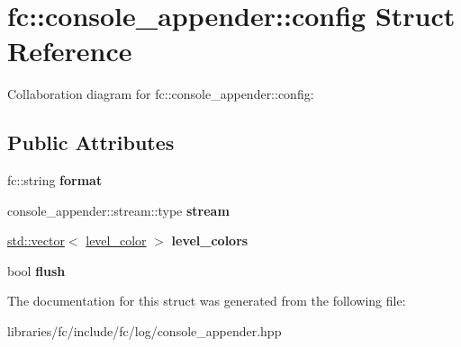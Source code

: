 \hypertarget{structfc_1_1console__appender_1_1config}{}\section{fc\+:\+:console\+\_\+appender\+:\+:config Struct Reference}
\label{structfc_1_1console__appender_1_1config}


Collaboration diagram for fc\+:\+:console\+\_\+appender\+:\+:config\+:
\subsection*{Public Attributes}
\begin{DoxyCompactItemize}
\item 
\mbox{\label{structfc_1_1console__appender_1_1config_a1dea130e65362a60dd783f59ac5e3996}} 
fc\+::string {\bfseries format}
\item 
\mbox{\label{structfc_1_1console__appender_1_1config_a10fae15093d04c12bbb6c433ac9f3af6}} 
console\+\_\+appender\+::stream\+::type {\bfseries stream}
\item 
\mbox{\label{structfc_1_1console__appender_1_1config_a2ef55ff9563d0e4285c543f94bfe0dbb}} 
\mbox{\hyperlink{classstd_1_1vector}{std\+::vector}}$<$ \mbox{\hyperlink{structfc_1_1console__appender_1_1level__color}{level\+\_\+color}} $>$ {\bfseries level\+\_\+colors}
\item 
\mbox{\label{structfc_1_1console__appender_1_1config_a3d6b5fa2d0aba1582ac3d46b5a71e602}} 
bool {\bfseries flush}
\end{DoxyCompactItemize}


The documentation for this struct was generated from the following file\+:\begin{DoxyCompactItemize}
\item 
libraries/fc/include/fc/log/console\+\_\+appender.\+hpp\end{DoxyCompactItemize}
